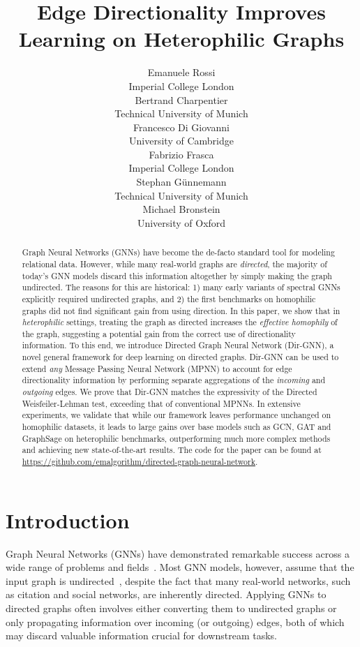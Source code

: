 \documentclass{article}
\title{Edge Directionality Improves Learning on Heterophilic Graphs}
\author[E. Rossi et al.]{Emanuele Rossi \\
  Imperial College London \\
\And
  Bertrand Charpentier \\
  Technical University of Munich \\
\And
  Francesco Di Giovanni \\
  University of Cambridge \\
\And
  Fabrizio Frasca \\
  Imperial College London \\
\And
  Stephan Günnemann \\
  Technical University of Munich \\
\And
  Michael Bronstein \\
  University of Oxford \\
}
\newcommand\ours{Directed Graph Neural Network}
\newcommand\oursacro{Dir-GNN}
\theoremstyle{plain}
\theoremstyle{definition}
\theoremstyle{remark}
\begin{document}
\maketitle


\begin{abstract}

Graph Neural Networks (GNNs) have become the de-facto standard tool for modeling relational data. However, while many real-world graphs are \emph{directed}, the majority of today's GNN models discard this information altogether by simply making the graph undirected.
The reasons for this are historical: 1) many early variants of spectral GNNs explicitly required undirected graphs, and 2) the first benchmarks on homophilic graphs did not find significant gain from using direction. 
In this paper, we show that in \emph{heterophilic} settings, treating the graph as directed increases the {\em effective homophily} of the graph, suggesting a potential gain from the correct use of directionality information.  
To this end, we introduce \ours{} (\oursacro{}), a novel general framework for deep learning on directed graphs. \oursacro{} can be used to extend \emph{any} Message Passing Neural Network (MPNN) to account for edge directionality information by performing separate aggregations of the \emph{incoming} and \emph{outgoing} edges. We prove that \oursacro{} matches the expressivity of the Directed Weisfeiler-Lehman test, exceeding that of conventional MPNNs. In extensive experiments, we validate that while our framework leaves performance unchanged on homophilic datasets, it leads to large gains over base models such as GCN, GAT and GraphSage on heterophilic benchmarks, outperforming much more complex methods and achieving new state-of-the-art results. 
The code for the paper can be found at \url{https://github.com/emalgorithm/directed-graph-neural-network}.
\end{abstract}

\section{Introduction}
\label{sec:introduction}

Graph Neural Networks (GNNs) have demonstrated remarkable success across a wide range of problems and fields~\cite{zhou2018gnn}. Most GNN models, however, assume that the input graph is undirected~\cite{kipf2016semi,velivckovic2017graph,hamilton2017inductive}, despite the fact that many real-world networks, such as citation and social networks, are inherently directed. Applying GNNs to directed graphs often involves either converting them to undirected graphs or only propagating information over incoming (or outgoing) edges, both of which may discard valuable information crucial for downstream tasks.
\end{document}
